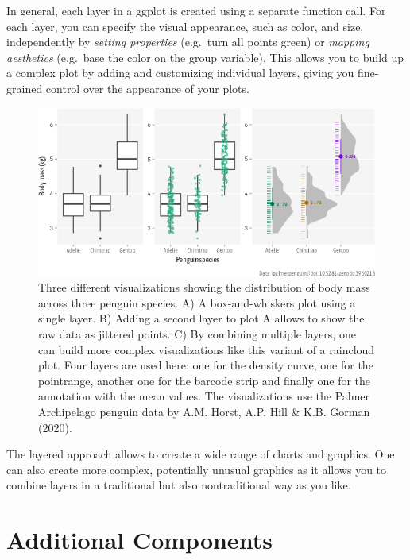 \documentclass[
]{krantz}
\begin{document}
In general, each layer in a ggplot is created using a separate function call. For each layer, you can specify the visual appearance, such as color, and size, independently by \emph{setting properties} (e.g.~turn all points green) or \emph{mapping aesthetics} (e.g.~base the color on the group variable). This allows you to build up a complex plot by adding and customizing individual layers, giving you fine-grained control over the appearance of your plots.

\begin{figure}
\centering
\includegraphics{bookdown_files/figure-latex/02ggplotLayersCombinedPenguins-1.png}
\caption{\label{fig:02ggplotLayersCombinedPenguins}Three different visualizations showing the distribution of body mass across three penguin species. A) A box-and-whiskers plot using a single layer. B) Adding a second layer to plot A allows to show the raw data as jittered points. C) By combining multiple layers, one can build more complex visualizations like this variant of a raincloud plot. Four layers are used here: one for the density curve, one for the pointrange, another one for the barcode strip and finally one for the annotation with the mean values. The visualizations use the Palmer Archipelago penguin data by A.M. Horst, A.P. Hill \& K.B. Gorman (2020).}
\end{figure}

The layered approach allows to create a wide range of charts and graphics. One can also create more complex, potentially unusual graphics as it allows you to combine layers in a traditional but also nontraditional way as you like.

\hypertarget{additional-components}{%
\section{Additional Components}\label{additional-components}}
\end{document}
